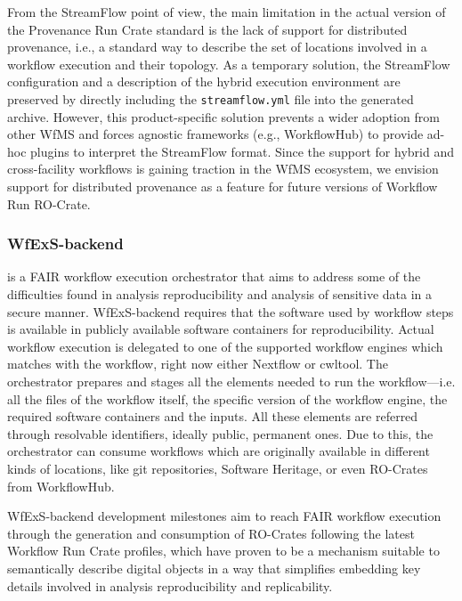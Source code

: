 From the StreamFlow point of view, the main limitation in the actual version of the Provenance Run Crate standard is the lack of support for distributed provenance, i.e., a standard way to describe the set of locations involved in a workflow execution and their topology. As a temporary solution,
the StreamFlow configuration and a description of the hybrid execution environment are preserved by directly including the \texttt{streamflow.yml} file into the generated archive.
However, this product-specific solution prevents a wider adoption from other WfMS and forces agnostic frameworks (e.g., WorkflowHub) to provide ad-hoc plugins to interpret the StreamFlow format.
Since the support for hybrid and cross-facility workflows is gaining traction in the WfMS ecosystem, we envision support for distributed provenance as a feature for future versions of Workflow Run RO-Crate.

\subsubsection{WfExS-backend}\label{ch54:wfexs}

 is a FAIR workflow execution orchestrator that aims to address some of the difficulties found in analysis reproducibility and analysis of sensitive data in a secure manner.
WfExS-backend requires that the software used by workflow steps is available in publicly available software containers for reproducibility.
Actual workflow execution is delegated to one of the supported workflow engines which matches with the workflow, right now either Nextflow or cwltool.
The orchestrator prepares and stages all the elements needed to run the workflow---i.e. all the files of the workflow itself, the specific version of the workflow engine, the required software containers and the inputs.
All these elements are referred through resolvable identifiers, ideally public, permanent ones.
Due to this, the orchestrator can consume workflows which are originally available in different kinds of locations, like git repositories, Software Heritage, or even RO-Crates from WorkflowHub.

WfExS-backend development milestones aim to reach FAIR workflow execution through the generation and consumption of RO-Crates following the latest Workflow Run Crate profiles, which have proven to be a mechanism suitable to semantically describe digital objects in a way that simplifies embedding key details involved in analysis reproducibility and replicability.

